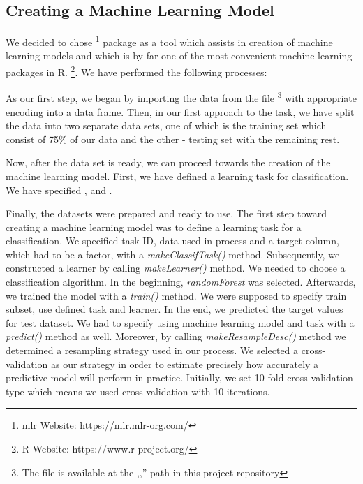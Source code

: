 

\subsection{Creating a Machine Learning Model}
We decided to chose  \footnote{mlr Website: https://mlr.mlr-org.com/} package as a tool which assists in creation of machine learning models and which is by far one of the most convenient machine learning packages in R. \footnote{R Website: https://www.r-project.org/}. We have performed the following processes:

As our first step, we began by importing the data from the  file \footnote{The  file is available at the ,,'' path in this project repository} with appropriate   encoding into a data frame.
Then, in our first approach to the task, we have split the data into two separate data sets, one of which is the training set which consist of 75\% of our data and the other - testing set with the remaining rest. 

Now, after the data set is ready, we can proceed towards the creation of the machine learning model. First, we have defined a learning task for classification. We have specified ,  and .


Finally, the datasets were prepared and ready to use. The first step toward creating a machine learning model was to define a learning task for a classification. We specified task ID, data used in process and a target column, which had to be a factor, with a \emph{makeClassifTask()} method. Subsequently, we constructed a learner by calling \emph{makeLearner()} method. We needed to choose a classification algorithm. In the beginning, \emph{randomForest} was selected. Afterwards, we trained the model with a \emph{train()} method. We were supposed to specify train subset, use defined task and learner. In the end, we predicted the target values for test dataset. We had to specify using machine learning model and task with a \emph{predict()} method as well. Moreover, by calling \emph{makeResampleDesc()} method we determined a resampling strategy used in our process. We selected a cross-validation as our strategy in order to estimate precisely how accurately a predictive model will perform in practice. Initially, we set 10-fold cross-validation type which means we used cross-validation with 10 iterations.

